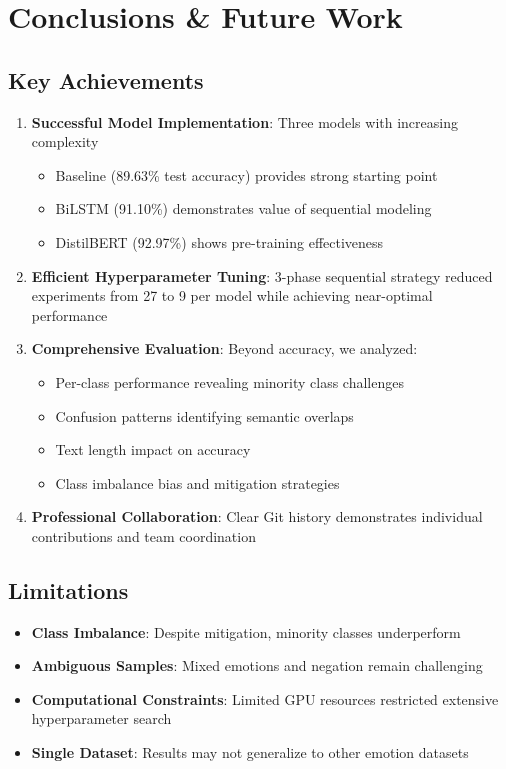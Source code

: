 \documentclass[12pt,a4paper]{article}
\begin{document}
\section{Conclusions \& Future Work}

\subsection{Key Achievements}
\begin{enumerate}
    \item \textbf{Successful Model Implementation}: Three models with increasing complexity
    \begin{itemize}
        \item Baseline (89.63\% test accuracy) provides strong starting point
        \item BiLSTM (91.10\%) demonstrates value of sequential modeling
        \item DistilBERT (92.97\%) shows pre-training effectiveness
    \end{itemize}
    
    \item \textbf{Efficient Hyperparameter Tuning}: 3-phase sequential strategy reduced experiments from 27 to 9 per model while achieving near-optimal performance
    
    \item \textbf{Comprehensive Evaluation}: Beyond accuracy, we analyzed:
    \begin{itemize}
        \item Per-class performance revealing minority class challenges
        \item Confusion patterns identifying semantic overlaps
        \item Text length impact on accuracy
        \item Class imbalance bias and mitigation strategies
    \end{itemize}
    
    \item \textbf{Professional Collaboration}: Clear Git history demonstrates individual contributions and team coordination
\end{enumerate}

\subsection{Limitations}
\begin{itemize}
    \item \textbf{Class Imbalance}: Despite mitigation, minority classes underperform
    \item \textbf{Ambiguous Samples}: Mixed emotions and negation remain challenging
    \item \textbf{Computational Constraints}: Limited GPU resources restricted extensive hyperparameter search
    \item \textbf{Single Dataset}: Results may not generalize to other emotion datasets
\end{itemize}
\end{document}
